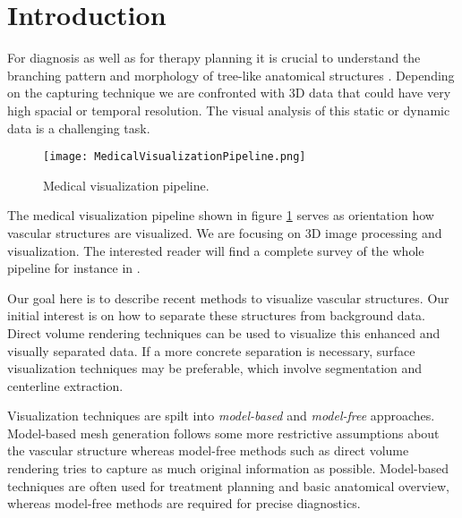 \section{Introduction}


For diagnosis as well as for therapy planning it is crucial to understand the branching pattern and morphology of tree-like anatomical structures \cite{preim2013visual}.
Depending on the capturing technique we are confronted with 3D data that could have very high spacial or temporal resolution. The visual analysis of this static or dynamic data is a challenging task.

\begin{figure}[h]
	\centering
	\texttt{[image: MedicalVisualizationPipeline.png]} \\
	\caption{Medical visualization pipeline.}
	\label{fig:MedicalVisualizationPipeline}
\end{figure}

The medical visualization pipeline shown in figure \ref{fig:MedicalVisualizationPipeline} serves as orientation how vascular structures are visualized. We are focusing on 3D image processing and visualization. The interested reader will find a complete survey of the whole pipeline for instance in \cite{preim2013visual}. 

Our goal here is to describe recent methods to visualize vascular structures. Our initial interest is on how to separate these structures from background data. Direct volume rendering techniques can be used to visualize this enhanced and visually separated data. If a more concrete separation is necessary, surface visualization techniques may be preferable, which involve segmentation and centerline extraction. 

Visualization techniques are spilt into \emph{model-based} and \emph{model-free} approaches. 
Model-based mesh generation follows some more restrictive assumptions about the vascular structure whereas model-free methods such as direct volume rendering tries to capture as much original information as possible. Model-based techniques are often used for treatment planning and basic anatomical overview, whereas model-free methods are required for precise diagnostics.


